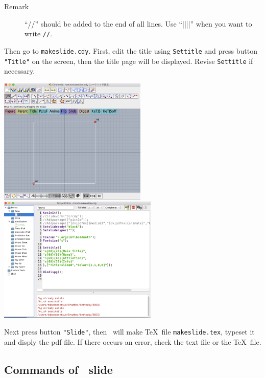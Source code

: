 \documentclass[papersize,a4paper,12pt]{article}
\begin{document}
\begin{description}
\item[Remark]``//'' should be added to the end of all lines. Use ``||||'' when you want to write \verb|//|.
\end{description}

Then go to \verb|makeslide.cdy|.
First, edit the title using \verb|Settitle| and press button \verb|"Title"| on the screen, then the title page will be displayed. Revise \verb|Settitle| if necessary.

\begin{center}
\includegraphics[bb=0.00 0.00 743.00 632.00,height=60mm]{fig/slidescreen.pdf}\hspace{5mm}
\includegraphics[bb=0.00 0.00 802.00 633.00,height=60mm]{fig/slidescript.pdf}
\end{center}

Next press button \verb|"Slide"|, then \ketcindy\ will make \TeX\ file \verb|makeslide.tex|,
typeset it and disply the pdf file. If there occurs an error, check the text file or the \TeX\ file.

\subsection{Commands of \ketcindy\ slide}
\end{document}
